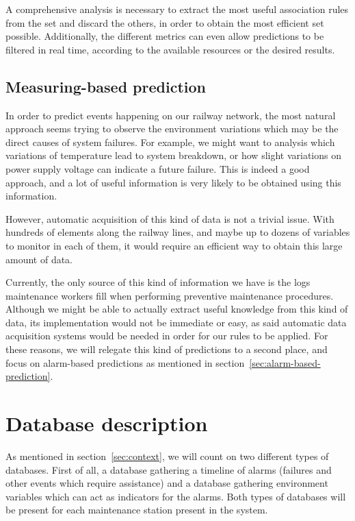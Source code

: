 \documentclass[a4paper,10pt]{report}
\begin{document}
A comprehensive analysis is necessary to extract the most useful association rules from the set and discard the others, in order to obtain the most efficient set possible. Additionally, the different metrics can even allow predictions to be filtered in real time, according to the available resources or the desired results.

\subsection{Measuring-based prediction}
In order to predict events happening on our railway network, the most natural approach seems trying to observe the environment variations which may be the direct causes of system failures. For example, we might want to analysis which variations of temperature lead to system breakdown, or how slight variations on power supply voltage can indicate a future failure. This is indeed a good approach, and a lot of useful information is very likely to be obtained using this information.

However, automatic acquisition of this kind of data is not a trivial issue. With hundreds of elements along the railway lines, and maybe up to dozens of variables to monitor in each of them, it would require an efficient way to obtain this large amount of data.

Currently, the only source of this kind of information we have is the logs maintenance workers fill when performing preventive maintenance procedures. Although we might be able to actually extract useful knowledge from this kind of data, its implementation would not be immediate or easy, as said automatic data acquisition systems would be needed in order for our rules to be applied. For these reasons, we will relegate this kind of predictions to a second place, and focus on alarm-based predictions as mentioned in section~\ref{sec:alarm-based-prediction}.

\section{Database description}
As mentioned in section~\ref{sec:context}, we will count on two different types of databases. First of all, a database gathering a timeline of alarms (failures and other events which require assistance) and a database gathering environment variables which can act as indicators for the alarms. Both types of databases will be present for each maintenance station present in the system.
\end{document}
